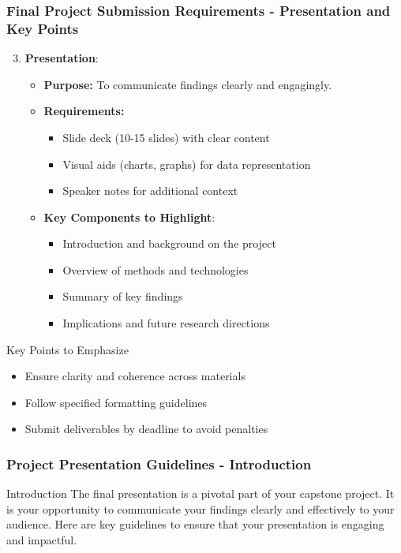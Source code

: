 \documentclass[aspectratio=169]{beamer}
\begin{document}
\begin{frame}[fragile]
    \frametitle{Final Project Submission Requirements - Presentation and Key Points}
    \begin{enumerate}
        \setcounter{enumi}{2}
        \item \textbf{Presentation}:
        \begin{itemize}
            \item \textbf{Purpose:} To communicate findings clearly and engagingly.
            \item \textbf{Requirements:}
            \begin{itemize}
                \item Slide deck (10-15 slides) with clear content
                \item Visual aids (charts, graphs) for data representation
                \item Speaker notes for additional context
            \end{itemize}
            \item \textbf{Key Components to Highlight}:
            \begin{itemize}
                \item Introduction and background on the project
                \item Overview of methods and technologies
                \item Summary of key findings
                \item Implications and future research directions
            \end{itemize}
        \end{itemize}
    \end{enumerate}

    \begin{block}{Key Points to Emphasize}
        \begin{itemize}
            \item Ensure clarity and coherence across materials
            \item Follow specified formatting guidelines
            \item Submit deliverables by deadline to avoid penalties
        \end{itemize}
    \end{block}
\end{frame}

\begin{frame}[fragile]
    \frametitle{Project Presentation Guidelines - Introduction}
    \begin{block}{Introduction}
        The final presentation is a pivotal part of your capstone project. It is your opportunity to communicate your findings clearly and effectively to your audience. Here are key guidelines to ensure that your presentation is engaging and impactful.
    \end{block}
\end{frame}
\end{document}
